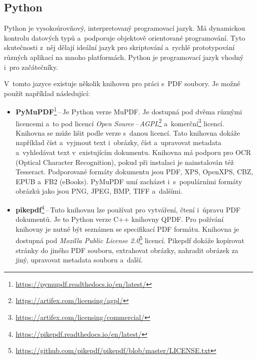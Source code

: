 \subsection*{Python}

Python je vysokoúrovňový, interpretovaný programovací jazyk. Má dynamickou
kontrolu datových typů a~podporuje objektově orientované programování. Tyto
skutečnosti z~něj dělají ideální jazyk pro skriptování a~rychlé prototypování
různých aplikací na mnoho platformách. Python je programovací jazyk vhodný i~pro
začátečníky.
\cite{Python}

V~tomto jazyce existuje několik knihoven pro práci s~PDF soubory. Je možné použít
například následující: 
\begin{itemize}
    \item \textbf{PyMuPDF}\footnote{
    \href{https://pymupdf.readthedocs.io/en/latest/}{https://pymupdf.readthedocs.io/en/latest/}
    }\,--\,Je Python verze MuPDF. Je dostupná pod dvěma různými licencemi a~to pod
    licencí \emph{Open Source\,--\,AGPL}\footnote{
    \href{https://artifex.com/licensing/agpl/}{https://artifex.com/licensing/agpl/}
    } a~komerční\footnote{
    \href{https://artifex.com/licensing/commercial/}{https://artifex.com/licensing/commercial/}
    } licencí. Knihovna se může lišit podle verze s~danou licencí. Tato knihovna
    dokáže například číst a~vyjmout text i~obrázky, číst a~upravovat
    metadata a~vyhledávat text v~existujícím dokumentu.
    Knihovna má podporu pro OCR (Optical Character Recognition), pokud při
    instalaci je nainstalován též Tesseract. Podporované formáty dokumentu jsou
    PDF, XPS, OpenXPS, CBZ, EPUB a~FB2 (eBooks). PyMuPDF umí zacházet
    i~s~populárními formáty obrázků jako jsou PNG, JPEG, BMP, TIFF a~dalšími.

    \item \textbf{pikepdf}\footnote{
    \href{https://pikepdf.readthedocs.io/en/latest/}{https://pikepdf.readthedocs.io/en/latest/}
    }\,--\,Tuto knihovnu lze používat pro vytváření, čtení i~úpravu PDF dokumentů.
    Je to Python verze C++ knihovny QPDF. Pro požívání knihovny je nutné být
    seznámen se specifikací PDF formátu. Knihovna je dostupná pod
    \emph{Mozilla Public License 2.0}\footnote{
    \href{https://github.com/pikepdf/pikepdf/blob/master/LICENSE.txt}{https://github.com/pikepdf/pikepdf/blob/master/LICENSE.txt}
    } licencí. Pikepdf dokáže kopírovat stránky do jiného PDF souboru, extrahovat
    obrázky, nahradit obrázek za jiný, upravovat metadata souboru a~další.

\end{itemize}


